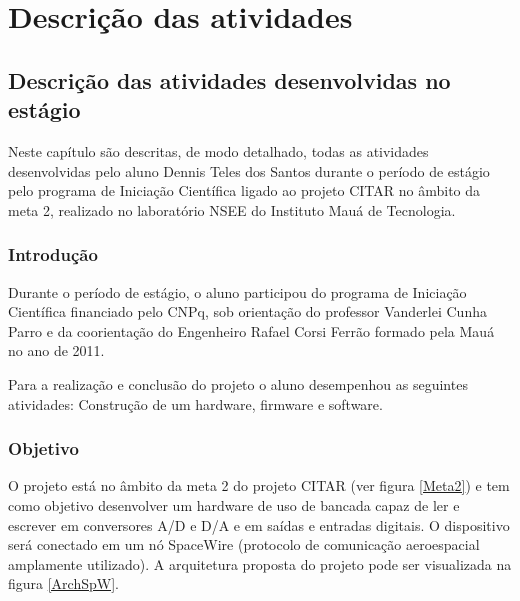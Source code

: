 \documentclass[
	12pt,				%
	openright,			%
	twoside,			%
	a4paper,			%
	english,			%
	french,				%
	spanish,			%
	brazil				%
	]{abntex2}
\begin{document}
\part{Descrição das atividades}

\chapter{Descrição das atividades desenvolvidas no estágio}
Neste capítulo são descritas, de modo detalhado, todas as atividades desenvolvidas pelo aluno Dennis Teles dos Santos durante o período de estágio pelo programa de Iniciação Científica ligado ao projeto CITAR no âmbito da meta 2, realizado no laboratório NSEE do Instituto Mauá de Tecnologia.

\section{Introdução}
Durante o período de estágio, o aluno participou do programa de Iniciação Científica financiado pelo CNPq, sob orientação do professor Vanderlei Cunha Parro e da coorientação do Engenheiro Rafael Corsi Ferrão formado pela Mauá no ano de 2011.

Para a realização e conclusão do projeto o aluno desempenhou as seguintes atividades: Construção de um hardware, firmware e software.

\section{Objetivo}

O projeto está no âmbito da meta 2 do projeto CITAR (ver figura \ref{Meta2}) e tem como objetivo desenvolver um hardware de uso de bancada capaz de ler e escrever em conversores A/D e D/A e em saídas e entradas digitais. O dispositivo será conectado em um nó SpaceWire (protocolo de comunicação aeroespacial amplamente utilizado). A arquitetura proposta do projeto pode ser visualizada na figura \ref{ArchSpW}.
\end{document}
